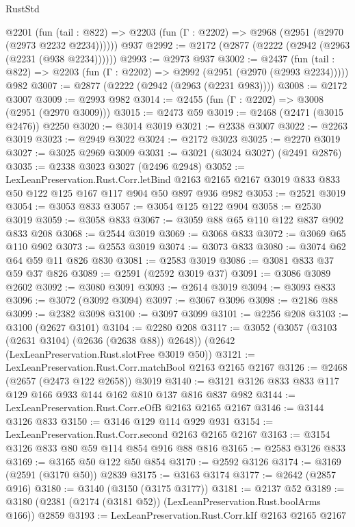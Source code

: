 \begin{lexlean}{RustStd}
\begin{coremodule}
    @2201
      (fun (tail : @822) => @2203 (fun (Γ : @2202) => @2968 (@2951 (@2970 (@2973 @2232 @2234))))))
    @937
@2992 := @2172 (@2877 (@2222 (@2942 (@2963 (@2231 (@938 @2234))))))
@2993 := @2973 @937
@3002 := @2437
    (fun (tail : @822) => @2203 (fun (Γ : @2202) => @2992 (@2951 (@2970 (@2993 @2234)))))
    @982
@3007 := @2877 (@2222 (@2942 (@2963 (@2231 @983))))
@3008 := @2172 @3007
@3009 := @2993 @982
@3014 := @2455 (fun (Γ : @2202) => @3008 (@2951 (@2970 @3009)))
@3015 := @2473 @59
@3019 := @2468 (@2471 (@3015 @2476)) @2250
@3020 := @3014 @3019
@3021 := @2338 @3007
@3022 := @2263 @3019
@3023 := @2949 @3022
@3024 := @2172 @3023
@3025 := @2270 @3019
@3027 := @3025 @2969 @3009
@3031 := @3021 (@3024 @3027) (@2491 @2876)
@3035 := @2338 @3023 @3027 (@2496 @2948)
@3052 := LexLeanPreservation.Rust.Corr.letBind
    @2163
    @2165
    @2167
    @3019
    @833
    @833
    @50
    @122
    @125
    @167
    @117
    @904
    @50
    @897
    @936
    @982
@3053 := @2521 @3019
@3054 := @3053 @833
@3057 := @3054 @125 @122 @904
@3058 := @2530 @3019
@3059 := @3058 @833
@3067 := @3059 @88 @65 @110 @122 @837 @902 @833 @208
@3068 := @2544 @3019
@3069 := @3068 @833
@3072 := @3069 @65 @110 @902
@3073 := @2553 @3019
@3074 := @3073 @833
@3080 := @3074 @62 @64 @59 @11 @826 @830
@3081 := @2583 @3019
@3086 := @3081 @833 @37 @59 @37 @826
@3089 := @2591 (@2592 @3019 @37)
@3091 := @3086 @3089 @2602
@3092 := @3080 @3091
@3093 := @2614 @3019
@3094 := @3093 @833
@3096 := @3072 (@3092 @3094)
@3097 := @3067 @3096
@3098 := @2186 @88
@3099 := @2382 @3098
@3100 := @3097 @3099
@3101 := @2256 @208
@3103 := @3100 (@2627 @3101)
@3104 := @2280 @208
@3117 := @3052
    (@3057 (@3103 (@2631 @3104) (@2636 (@2638 @88)) @2648))
    (@2642 (LexLeanPreservation.Rust.slotFree @3019 @50))
@3121 := LexLeanPreservation.Rust.Corr.matchBool @2163 @2165 @2167
@3126 := @2468 (@2657 (@2473 @122 @2658)) @3019
@3140 := @3121 @3126 @833 @833 @117 @129 @166 @933 @144 @162 @810 @137 @816 @837 @982
@3144 := LexLeanPreservation.Rust.Corr.eOfB @2163 @2165 @2167
@3146 := @3144 @3126 @833
@3150 := @3146 @129 @114 @929 @931
@3154 := LexLeanPreservation.Rust.Corr.second @2163 @2165 @2167
@3163 := @3154 @3126 @833 @80 @59 @114 @854 @916 @88 @816
@3165 := @2583 @3126 @833
@3169 := @3165 @50 @122 @50 @854
@3170 := @2592 @3126
@3174 := @3169 (@2591 (@3170 @50)) @2839
@3175 := @3163 @3174
@3177 := @2642 (@2857 @916)
@3180 := @3140 (@3150 (@3175 @3177))
@3181 := @2137 @52
@3189 := @3180 (@2381 (@2174 (@3181 @52)) (LexLeanPreservation.Rust.boolArms @166)) @2859
@3193 := LexLeanPreservation.Rust.Corr.kIf @2163 @2165 @2167

\end{coremodule}
\end{lexlean}
